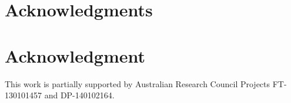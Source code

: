 \documentclass[10pt,journal,cspaper,compsoc]{IEEEtran}
\begin{document}
%


\ifCLASSOPTIONcompsoc
  \section*{Acknowledgments}
\else
  \section*{Acknowledgment}
\fi
This work is partially supported by Australian Research Council Projects FT-130101457 and DP-140102164.







%
\end{document}
